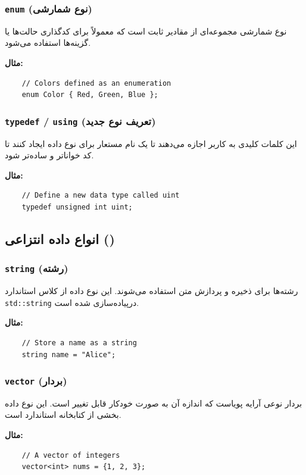 \documentclass[12pt, a4paper]{report}
\begin{document}
\subsubsection{ \texttt{enum} (نوع شمارشی)}
نوع شمارشی مجموعه‌ای از مقادیر ثابت است که معمولاً برای کدگذاری حالت‌ها یا گزینه‌ها استفاده می‌شود.

\textbf{مثال:}
\LTR
\begin{lstlisting}
	// Colors defined as an enumeration
	enum Color { Red, Green, Blue };
\end{lstlisting}
\RTL

\subsubsection{\texttt{typedef} / \texttt{using} (تعریف نوع جدید)}
این کلمات کلیدی به کاربر اجازه می‌دهند تا یک نام مستعار برای نوع داده ایجاد کنند تا کد خواناتر و ساده‌تر شود.

\textbf{مثال:}
\LTR
\begin{lstlisting}
	// Define a new data type called uint
	typedef unsigned int uint;
\end{lstlisting}
\RTL

\subsection{انواع داده انتزاعی ()}

\subsubsection{\texttt{string} (رشته)}
رشته‌ها برای ذخیره و پردازش متن استفاده می‌شوند. این نوع داده از کلاس استاندارد \texttt{std::string} درپیاده‌سازی شده است.

\textbf{مثال:}
\LTR
\begin{lstlisting}
	// Store a name as a string
	string name = "Alice";
\end{lstlisting}
\RTL

\subsubsection{ \texttt{vector} (بردار)}
بردار نوعی آرایه پویاست که اندازه آن به صورت خودکار قابل تغییر است. این نوع داده بخشی از کتابخانه استاندارد است.

\textbf{مثال:}
\LTR
\begin{lstlisting}
	// A vector of integers
	vector<int> nums = {1, 2, 3};
\end{lstlisting}
\RTL
\end{document}
